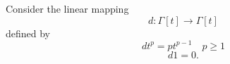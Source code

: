 Consider the linear mapping
$$d: \Gamma[t] \rightarrow \Gamma[t]$$
defined by
$$dt^p = p t^{p-1} \quad p \geq 1$$
$$d1 = 0.$$
